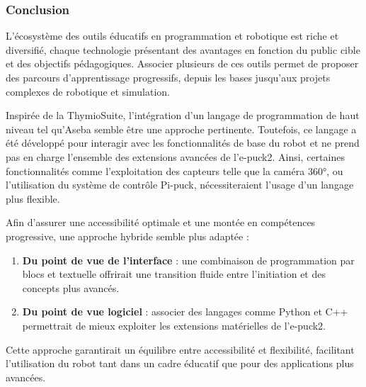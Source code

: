 \subsubsection{Conclusion}

L'écosystème des outils éducatifs en programmation et robotique est riche et diversifié, chaque technologie présentant des avantages en fonction du public cible et des objectifs pédagogiques.
Associer plusieurs de ces outils permet de proposer des parcours d’apprentissage progressifs, depuis les bases jusqu’aux projets complexes de robotique et simulation.

Inspirée de la ThymioSuite, l'intégration d’un langage de programmation de haut niveau tel qu'Aseba semble être une approche pertinente.
Toutefois, ce langage a été développé pour interagir avec les fonctionnalités de base du robot et ne prend pas en charge l'ensemble des extensions avancées de l'e-puck2.
Ainsi, certaines fonctionnalités comme l’exploitation des capteurs telle que la caméra 360°, ou l'utilisation du système de contrôle Pi-puck, nécessiteraient l’usage d’un langage plus flexible.

Afin d’assurer une accessibilité optimale et une montée en compétences progressive, une approche hybride semble plus adaptée : 
\begin{enumerate}
    \item \textbf{Du point de vue de l’interface} : une combinaison de programmation par blocs et textuelle offrirait une transition fluide entre l’initiation et des concepts plus avancés.  
    \item \textbf{Du point de vue logiciel} : associer des langages comme Python et C++ permettrait de mieux exploiter les extensions matérielles de l'e-puck2.
\end{enumerate}
Cette approche garantirait un équilibre entre accessibilité et flexibilité, facilitant l’utilisation du robot tant dans un cadre éducatif que pour des applications plus avancées.

